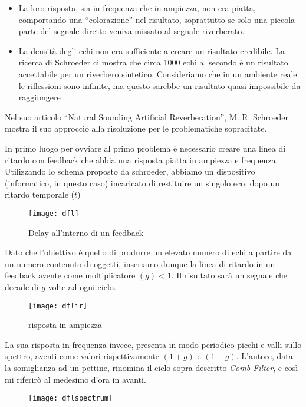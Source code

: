\begin{itemize}
\item La loro risposta, sia in frequenza che in ampiezza, non era piatta, comportando una “colorazione” nel risultato, soprattutto se solo una piccola parte del segnale diretto veniva missato al segnale riverberato.
\item La densità degli echi non era sufficiente a creare un risultato credibile. La ricerca di Schroeder ci mostra che circa 1000 echi al secondo è un risultato accettabile per un riverbero sintetico. Consideriamo che in un ambiente reale le riflessioni sono infinite, ma questo sarebbe un risultato quasi impossibile da raggiungere
\end{itemize}

Nel suo articolo “Natural Sounding Artificial Reverberation”, M. R. Schroeder mostra il suo approccio alla risoluzione per le problematiche sopracitate.

In primo luogo per ovviare al primo problema è necessario creare una linea di ritardo con feedback che abbia una risposta piatta in ampiezza e frequenza.
Utilizzando lo schema proposto da schroeder, abbiamo un dispositivo (informatico, in questo caso) incaricato di restituire un singolo eco, dopo un ritardo temporale ($t$)

\begin{figure}[htp]
\centering
\texttt{[image: dfl]}
\caption{Delay all'interno di un feedback}
\label{fig:dfl}
\end{figure}

Dato che l'obiettivo è quello di produrre un elevato numero di echi a partire da un numero contenuto di oggetti, inseriamo dunque la linea di ritardo in un feedback avente come moltiplicatore $(g) < 1$.
Il risultato sarà un segnale che decade di $g$ volte ad ogni ciclo.

\begin{figure}[htp]
\centering
\texttt{[image: dflir]}
\caption{risposta in ampiezza}
\label{fig:dflir}
\end{figure}

La sua risposta in frequenza invece, presenta in modo periodico picchi e valli sullo spettro, aventi come valori rispettivamente $(1+g)$ e $(1-g)$. L’autore, data la somiglianza ad un pettine, rinomina il ciclo sopra descritto \emph{Comb Filter}, e così mi riferirò al medesimo d’ora in avanti.

\begin{figure}[htp]
\centering
\texttt{[image: dflspectrum]}
\caption{}
\label{fig:dflspectrum}
\end{figure}

